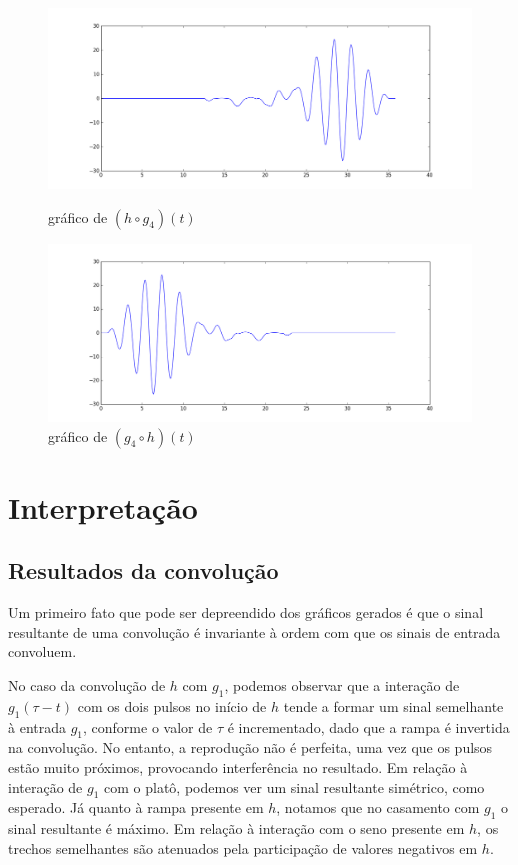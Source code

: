 \documentclass[12pt]{article}
\begin{document}
\begin{figure}[!h]
	\centering
	\begin{minipage}[b]{0.49\linewidth}
		\includegraphics[width=1.15\linewidth]{hog4.png}
		\caption{gráfico de $(h\circ g_4)(t)$}
	\end{minipage}
	\hfill
	\begin{minipage}[b]{0.49\linewidth}
		\includegraphics[width=1.15\linewidth]{g4oh.png}
		\caption{gráfico de $(g_4\circ h)(t)$}
	\end{minipage}
\end{figure}

\section{Interpretação}

\subsection{Resultados da convolução}
Um primeiro fato que pode ser depreendido dos gráficos gerados é que o sinal resultante de uma convolução é invariante à ordem com que os sinais de entrada convoluem.

No caso da convolução de $h$ com $g_1$, podemos observar que a interação de $g_1(\tau-t)$ com os dois pulsos no início de $h$ tende a formar um sinal semelhante à entrada $g_1$, conforme o valor de $\tau$ é incrementado, dado que a rampa é invertida na convolução. No entanto, a reprodução não é perfeita, uma vez que os pulsos estão muito próximos, provocando interferência no resultado. Em relação à interação de $g_1$ com o platô, podemos ver um sinal resultante simétrico, como esperado. Já quanto à rampa presente em $h$, notamos que no casamento com $g_1$ o sinal resultante é máximo. Em relação à interação com o seno presente em $h$, os trechos semelhantes são atenuados pela participação de valores negativos em $h$.
\end{document}
